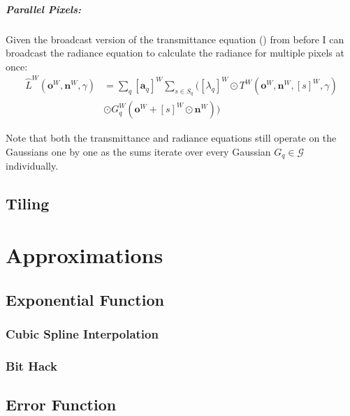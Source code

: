 \documentclass[a4paper, 11pt]{memoir}
\begin{document}
    \paragraph{Parallel Pixels:}
    \label{par:parallel_pixels}
    Given the broadcast version of the \gls{transmittance} equation () from before I can broadcast the \gls{radiance} equation to
    calculate the \gls{radiance} for multiple pixels at once:
    \begin{equation}
        \begin{aligned}
            \hat{L}^W(\mathbf{o}^W, \mathbf{n}^W, \gamma) &= \sum_q [ \mathbf{a}_q ]^W \sum_{s \in S_q} \Big(
            [ \lambda_q ]^W \odot T^W(\mathbf{o}^W, \mathbf{n}^W, [ s ]^W, \gamma)\\
            &\odot G_q^W(\mathbf{o}^W + [ s ]^W \odot \mathbf{n}^W) \Big)
        \end{aligned}
        \label{eq:radiance_parallel_pixels}
    \end{equation}

    Note that both the \gls{transmittance} and \gls{radiance} equations still operate on the Gaussians one by one as the
    sums iterate over every Gaussian $G_q \in \mathcal{G}$ individually.

    \section{Tiling}
    
    \chapter{Approximations}
    \section{Exponential Function}
    \subsection{Cubic Spline Interpolation}
    \subsection{Bit Hack}
    \cite{fast_exp}
    
    \section{Error Function}
\end{document}
